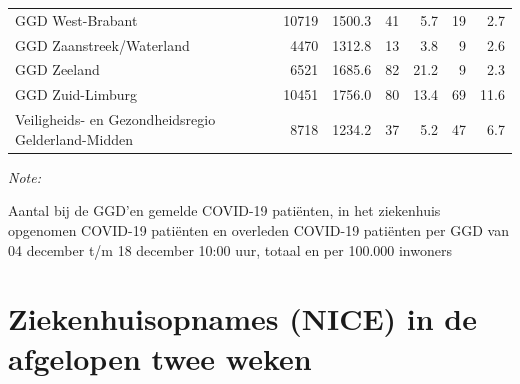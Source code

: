 \documentclass[
  english,
  man,floatsintext]{apa6}
\begin{document}
\begin{table}
\begin{threeparttable}
\begin{tabular}{lrrrrrr}
GGD West-Brabant & 10719 & 1500.3 & 41 & 5.7 & 19 & 2.7\\
GGD Zaanstreek/Waterland & 4470 & 1312.8 & 13 & 3.8 & 9 & 2.6\\
GGD Zeeland & 6521 & 1685.6 & 82 & 21.2 & 9 & 2.3\\
GGD Zuid-Limburg & 10451 & 1756.0 & 80 & 13.4 & 69 & 11.6\\
Veiligheids- en Gezondheidsregio Gelderland-Midden & 8718 & 1234.2 & 37 & 5.2 & 47 & 6.7\\
\bottomrule
\end{tabular}
\begin{tablenotes}
\item \textit{Note: } 
\item Aantal bij de GGD’en gemelde COVID-19 patiënten, in het ziekenhuis opgenomen COVID-19 patiënten en overleden COVID-19 patiënten per GGD van 04 december t/m 18 december 10:00 uur, totaal en per 100.000 inwoners
\end{tablenotes}
\end{threeparttable}
\endgroup{}
\end{table}

\newpage

\hypertarget{ziekenhuisopnames-nice-in-de-afgelopen-twee-weken}{%
\section{Ziekenhuisopnames (NICE) in de afgelopen twee weken}\label{ziekenhuisopnames-nice-in-de-afgelopen-twee-weken}}
\end{document}

